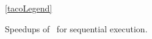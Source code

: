 \begin{figure}[t]
    \ref{tacoLegend}
    \centering
    

    



    \caption{Speedups of \ourtool\ for sequential execution.}
    \label{fig:frostt_sequential}
    
\end{figure}
